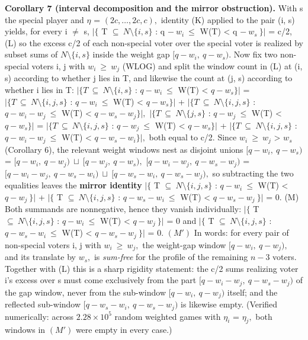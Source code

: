 \documentclass[
]{article}
\begin{document}
\textbf{Corollary 7 (interval decomposition and the mirror
obstruction).} With s the special player and \(\eta\) =
\((2c,\dots,2c,c),\) identity (K) applied to the pair (i, s) yields, for
every i \(\ne\) s, \(\vert\{\) T \(\subseteq\ N\setminus\{i,s\}\) : q
\(-\ w_i\ \le\) W(T) \textless{} q \(-\ w_s\ \}\vert\) = c/2, (L) so the
excess c/2 of each non-special voter over the special voter is realized
by subset sums of \(N\setminus\{i,s\}\) inside the weight gap
\([q-w_i,\ q-w_s).\) Now fix two non-special voters i, j with
\(w_i\ \ge\ w_j\) (WLOG) and split the window count in (L) at (i, s)
according to whether j lies in T, and likewise the count at (j, s)
according to whether i lies in T:
\(\vert\{T\ \subseteq\ N\setminus\{i,s\}\) : \(q-w_i\ \le\) W(T)
\textless{} \(q-w_s\}\vert\) =
\(\vert\{T\ \subseteq\ N\setminus\{i,j,s\}\) : \(q-w_i\ \le\) W(T)
\textless{} \(q-w_s\}\vert\) +
\(\vert\{T\ \subseteq\ N\setminus\{i,j,s\}\) : \(q-w_i-w_j\ \le\) W(T)
\textless{} \(q-w_s-w_j\}\vert,\)
\(\vert\{T\ \subseteq\ N\setminus\{j,s\}\) : \(q-w_j\ \le\) W(T)
\textless{} \(q-w_s\}\vert\) =
\(\vert\{T\ \subseteq\ N\setminus\{i,j,s\}\) : \(q-w_j\ \le\) W(T)
\textless{} \(q-w_s\}\vert\) +
\(\vert\{T\ \subseteq\ N\setminus\{i,j,s\}\) : \(q-w_i-w_j\ \le\) W(T)
\textless{} \(q-w_s-w_i\}\vert,\) both equal to c/2. Since
\(w_i\ \ge\ w_j\) \textgreater{} \(w_s\) (Corollary 6), the relevant
weight windows nest as disjoint unions \([q-w_i,\ q-w_s)\) =
\([q-w_i,\ q-w_j)\ \sqcup\ [q-w_j,\ q-w_s),\)
\([q-w_i-w_j,\ q-w_s-w_j)\) =
\([q-w_i-w_j,\ q-w_s-w_i)\ \sqcup\ [q-w_s-w_i,\ q-w_s-w_j),\) so
subtracting the two equalities leaves the \textbf{mirror identity}
\(\vert\{\) T \(\subseteq\ N\setminus\{i,j,s\}\) : \(q-w_i\ \le\) W(T)
\textless{} \(q-w_j\ \}\vert\) + \(\vert\{\) T
\(\subseteq\ N\setminus\{i,j,s\}\) : \(q-w_s-w_i\ \le\) W(T) \textless{}
\(q-w_s-w_j\ \}\vert\) = 0. (M) Both summands are nonnegative, hence
they vanish individually: \(\vert\{\) T
\(\subseteq\ N\setminus\{i,j,s\}\) : \(q-w_i\ \le\) W(T) \textless{}
\(q-w_j\ \}\vert\) = 0 and \(\vert\{\) T
\(\subseteq\ N\setminus\{i,j,s\}\) : \(q-w_s-w_i\ \le\) W(T) \textless{}
\(q-w_s-w_j\ \}\vert\) = 0. \((M')\) In words: for every pair of
non-special voters i, j with \(w_i\ \ge\ w_j,\) the weight-gap window
\([q-w_i,\ q-w_j),\) and its translate by \(w_s,\) is \emph{sum-free}
for the profile of the remaining \(n-3\) voters. Together with (L) this
is a sharp rigidity statement: the c/2 sums realizing voter i's excess
over s must come exclusively from the part \([q-w_i-w_j,\ q-w_s-w_j)\)
of the gap window, never from the sub-window \([q-w_i,\ q-w_j)\) itself;
and the reflected sub-window \([q-w_s-w_i,\ q-w_s-w_j)\) is likewise
empty. (Verified numerically: across \(2.28\times10^5\) random weighted
games with \(\eta_i\) = \(\eta_j,\) both windows in \((M')\) were empty
in every case.)
\end{document}
